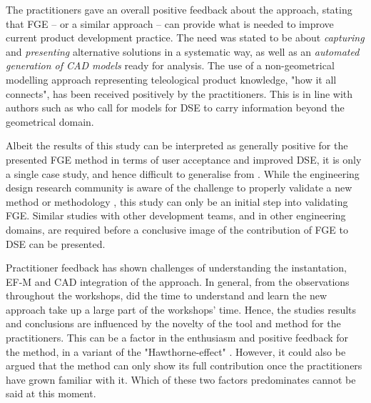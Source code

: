 \documentclass[aerospace,article,submit,moreauthors,pdftex]{Definitions/mdpi}
\begin{document}
The practitioners gave an overall positive feedback about the approach, stating that \ac{FGE} -- or a similar approach -- can provide what is needed to improve current product development practice.
The need was stated to be about \textit{capturing} and \textit{presenting} alternative solutions in a systematic way, as well as an \textit{automated generation of CAD models} ready for analysis.
The use of a non-geometrical modelling approach representing teleological product knowledge, "how it all connects", has been received positively by the practitioners.
This is in line with authors such as \cite{Woodbury2006, Cohrs2014, Umeda1997FunctionalDesign} who call for models for \ac{DSE} to carry information beyond the geometrical domain.

Albeit the results of this study can be interpreted as generally positive for the presented \ac{FGE} method in terms of user acceptance and improved \ac{DSE}, it is only a single case study, and hence difficult to generalise from \citep{Blessing2009}.
While the engineering design research community is aware of the challenge to properly validate a new method or methodology \citep{Barth2011, Almefelt2006}, this study can only be an initial step into validating \ac{FGE}.
Similar studies with other development teams, and in other engineering domains, are required before a conclusive image of the contribution of \ac{FGE} to \ac{DSE} can be presented.


Practitioner feedback has shown challenges of understanding the instantation, \ac{EF-M} and CAD integration of the approach.
In general, from the observations throughout the workshops, did the time to understand and learn the new approach take up a large part of the workshops' time.
Hence, the studies results and conclusions are influenced by the novelty of the tool and method for the practitioners.
This can be a factor in the enthusiasm and positive feedback for the method, in a variant of the "Hawthorne-effect" \cite{MaccarneyHawthorne}.
However, it could also be argued that the method can only show its full contribution once the practitioners have grown familiar with it.
Which of these two factors predominates cannot be said at this moment.
\end{document}
